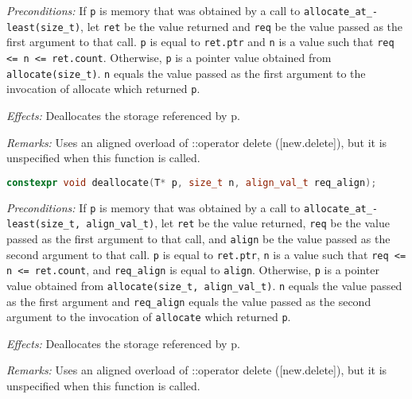 \documentclass[11pt]{article}
\begin{document}
\hangindent=1.05cm\hspace{1cm}\textit{Preconditions:} If \texttt{p} is memory that was obtained by a call to \texttt{allocate\_­at\_­least(size_t)}, let \texttt{ret} be the value returned and \texttt{req} be the value passed as the first argument to that call. \texttt{p} is equal to \texttt{ret.ptr} and \texttt{n} is a value such that \texttt{req <= n <= ret.count}.
Otherwise, \texttt{p} is a pointer value obtained from \texttt{allocate(size_t)}.
\texttt{n} equals the value passed as the first argument to the invocation of allocate which returned \texttt{p}.


\hangindent=1.05cm\hspace{1cm}\textit{Effects:} Deallocates the storage referenced by p.

\hangindent=1.05cm\hspace{1cm}\textit{Remarks:} Uses an aligned overload of ::operator delete ([new.delete]), but it is unspecified when this function is called.

\begin{lstlisting}[language=C++, basicstyle=\small]
constexpr void deallocate(T* p, size_t n, align_val_t req_align);
\end{lstlisting}

\hangindent=1.05cm\hspace{1cm}\textit{Preconditions:} If \texttt{p} is memory that was obtained by a call to \texttt{allocate\_­at\_­least(size_t, align_val_t)}, let \texttt{ret} be the value returned, \texttt{req} be the value passed as the first argument to that call, and \texttt{align} be the value passed as the second argument to that call. \texttt{p} is equal to \texttt{ret.ptr}, \texttt{n} is a value such that \texttt{req <= n <= ret.count}, and \texttt{req_align} is equal to \texttt{align}.
Otherwise, \texttt{p} is a pointer value obtained from \texttt{allocate(size_t, align_val_t)}.
\texttt{n} equals the value passed as the first argument and \texttt{req_align} equals the value passed as the second argument to the invocation of \texttt{allocate} which returned \texttt{p}.


\hangindent=1.05cm\hspace{1cm}\textit{Effects:} Deallocates the storage referenced by p.

\hangindent=1.05cm\hspace{1cm}\textit{Remarks:} Uses an aligned overload of ::operator delete ([new.delete]), but it is unspecified when this function is called.
\end{document}
